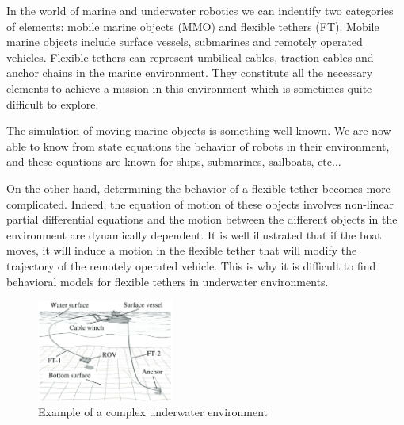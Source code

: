 In the world of marine and underwater robotics we can indentify two categories of elements: mobile marine objects (MMO) and flexible tethers (FT). Mobile marine objects include surface vessels, submarines and remotely operated vehicles. Flexible tethers can represent umbilical cables, traction cables and anchor chains in the marine environment. They constitute all the necessary elements to achieve a mission in this environment which is sometimes quite difficult to explore.

The simulation of moving marine objects is something well known. We are now able to know from state equations the behavior of robots in their environment, and these equations are known for ships, submarines, sailboats, etc...

On the other hand, determining the behavior of a flexible tether becomes more complicated. Indeed, the equation of motion of these objects involves non-linear partial differential equations and the motion between the different objects in the environment are dynamically dependent. It is well illustrated that if the boat moves, it will induce a motion in the flexible tether that will modify the trajectory of the remotely operated vehicle. This is why it is difficult to find behavioral models for flexible tethers in underwater environments.

\begin{figure}
	\centering
	\includegraphics[width=0.4\textwidth]{imgs/underwater_environment.png}
	\caption{Example of a complex underwater environment }
	\label{fig:underwater_environment}
\end{figure}